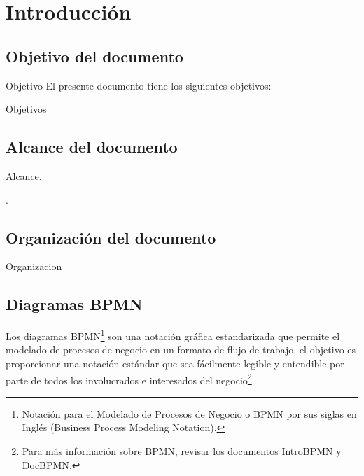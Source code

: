 %
%

\chapter{Introducción}

\section{Objetivo del documento}

Objetivo
\noindent El presente documento tiene los siguientes objetivos:\\

\begin{objetivosDoc}
	\item Objetivos
\end{objetivosDoc}

\section{Alcance del documento}

Alcance. \\
\begin{UClist}
	.
\end{UClist}


\section{Organización del documento}
Organizacion

\section{Diagramas BPMN}

Los diagramas BPMN\footnote{Notación para el Modelado de Procesos de Negocio o BPMN por sus siglas en Inglés (Business Process Modeling Notation).} son una notación gráfica estandarizada que permite el modelado de procesos de negocio en un formato de flujo de trabajo, el objetivo es proporcionar una notación estándar que sea fácilmente legible y entendible por parte de todos los involucrados e interesados del negocio\footnote{Para más información sobre BPMN, revisar los documentos IntroBPMN y DocBPMN.}.\\

